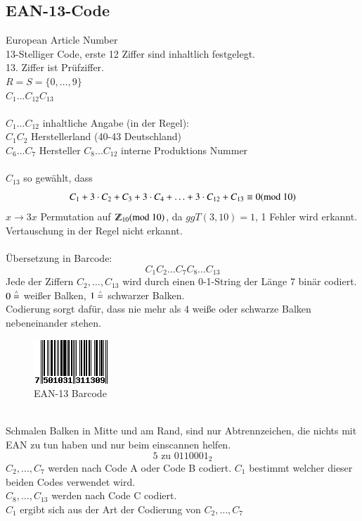 \subsection{EAN-13-Code}
European Article Number\\
13-Stelliger Code, erste 12 Ziffer sind inhaltlich festgelegt.\\
13. Ziffer ist Pr\"ufziffer.\\
$R=S=\{ 0, \ldots, 9\}$ \\
$C_1 \ldots C_{12} C_{13}$\\
\\
$C_1 \ldots C_{12}$ inhaltliche Angabe (in der Regel):\\
$C_1 C_2$ Herstellerland (40-43 Deutschland)\\
$C_6 \ldots C_7$ Hersteller
$C_8 \ldots C_{12}$ interne Produktions Nummer\\
\\
$C_{13}$ so gew\"ahlt, dass
\[
	C_1 + 3\cdot C_2 + C_3 + 3\cdot C_4 + \ldots + 3\cdot C_{12} + C_{13} \equiv 0 (\text{mod }10)
\]
$x \rightarrow 3x$ Permutation auf $\Z_{10} (\md{10})$, da $ggT(3,10)=1$, %
1 Fehler wird erkannt. Vertauschung in der Regel nicht erkannt. \\
\\
\"Ubersetzung in Barcode:
\[	
	C_1 C_2 \ldots C_7 C_8 \ldots C_{13}
\]
Jede der Ziffern $C_2, \ldots, C_{13}$ wird durch einen 0-1-String der L\"ange 7 bin\"ar codiert. \\
$0 \stackrel{\scriptscriptstyle\wedge}{=}$ wei\ss er Balken, $1 \stackrel{\scriptscriptstyle\wedge}{=}$ schwarzer Balken. \\
Codierung sorgt daf\"ur, dass nie mehr als 4 wei\ss e oder schwarze Balken nebeneinander stehen. \\
\begin{figure}[h]
	\centering
	\includegraphics{./img/ean13.png}
	\caption{EAN-13 Barcode}
	\label{img:EAN-13 Barcode}
\end{figure}
\\
Schmalen Balken in Mitte und am Rand, sind nur Abtrennzeichen, die nichts mit EAN zu tun haben und nur beim einscannen helfen.\\
\[
	5 \text{ zu }0110001_2
\]
$C_2,\ldots, C_7$ werden nach Code A oder Code B codiert. $C_1$ bestimmt welcher dieser beiden Codes verwendet wird. \\
$C_8,\ldots, C_{13}$ werden nach Code C codiert.\\
$C_1$ ergibt sich aus der Art der Codierung von $C_2,\ldots,C_7$

